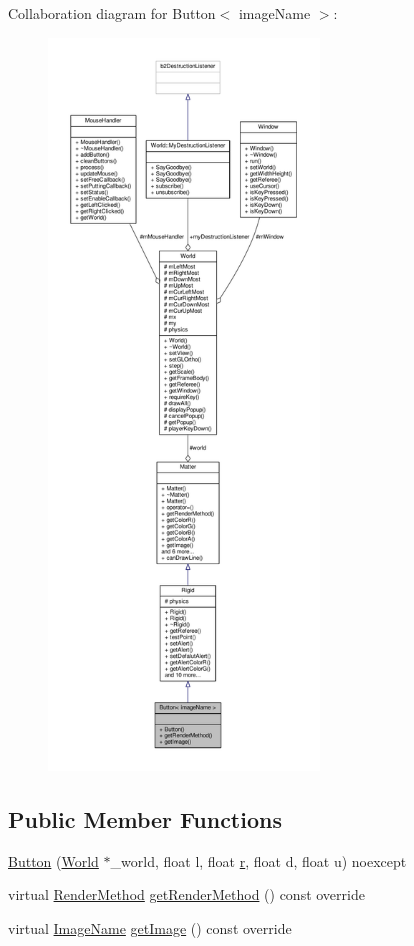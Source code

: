 Collaboration diagram for Button$<$ image\+Name $>$\+:\nopagebreak
\begin{figure}[H]
\begin{center}
\leavevmode
\includegraphics[height=550pt]{classButton__coll__graph}
\end{center}
\end{figure}
\subsection*{Public Member Functions}
\begin{DoxyCompactItemize}
\item 
\hyperlink{classButton_a36705b8de68995c157c107af83e94644}{Button} (\hyperlink{classWorld}{World} $\ast$\+\_\+world, float l, float \hyperlink{image_8h_a62969232668331297e2dca1ae2ddd10d}{r}, float d, float u) noexcept
\item 
virtual \hyperlink{classMatter_ade1ce1bf81f25377f689d103cd431907}{Render\+Method} \hyperlink{classButton_a50233f0c531652154ecc0f8f7dc26571}{get\+Render\+Method} () const override
\item 
virtual \hyperlink{image_8h_af9361b398b5cfcafbe93f82e8eaeb080}{Image\+Name} \hyperlink{classButton_a75331f4a815ee394a223812681460e09}{get\+Image} () const override
\end{DoxyCompactItemize}
